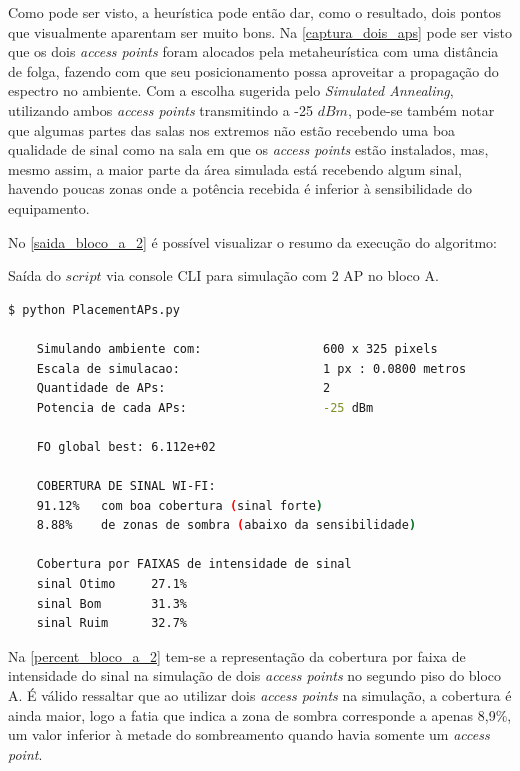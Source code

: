 \documentclass[
	12pt,				%
	twoside,			%
	a4paper,			%
	english,			%
	french,				%
	spanish,			%
	brazil				%
	]{abntex2}
\begin{document}
Como pode ser visto, a heurística pode então dar, como o resultado, dois
pontos que visualmente aparentam ser muito bons. Na
\autoref{captura_dois_aps} pode ser visto que os dois \emph{access
points} foram alocados pela metaheurística com uma distância de folga,
fazendo com que seu posicionamento possa aproveitar a propagação do
espectro no ambiente. Com a escolha sugerida pelo \emph{Simulated
Annealing}, utilizando ambos \emph{access points} transmitindo a -25
\(dBm\), pode-se também notar que algumas partes das salas nos extremos
não estão recebendo uma boa qualidade de sinal como na sala em que os
\emph{access points} estão instalados, mas, mesmo assim, a maior parte
da área simulada está recebendo algum sinal, havendo poucas zonas onde a
potência recebida é inferior à sensibilidade do equipamento.

No \autoref{saida_bloco_a_2} é possível visualizar o resumo da execução
do algoritmo:

\begin{quadro}[!htb]
    \caption{\label{saida_bloco_a_2} Saída do $script$ via console CLI para simulação com 2 AP no bloco A. }

    \begin{lstlisting}[language=bash]
    $ python PlacementAPs.py 

    Simulando ambiente com:                 600 x 325 pixels
    Escala de simulacao:                    1 px : 0.0800 metros
    Quantidade de APs:                      2
    Potencia de cada APs:                   -25 dBm

    FO global best: 6.112e+02

    COBERTURA DE SINAL WI-FI:
    91.12%   com boa cobertura (sinal forte)
    8.88%    de zonas de sombra (abaixo da sensibilidade)

    Cobertura por FAIXAS de intensidade de sinal
    sinal Otimo     27.1%
    sinal Bom       31.3%
    sinal Ruim      32.7%
    \end{lstlisting}

\end{quadro}

Na \autoref{percent_bloco_a_2} tem-se a representação da cobertura por
faixa de intensidade do sinal na simulação de dois \emph{access points}
no segundo piso do bloco A. É válido ressaltar que ao utilizar dois
\emph{access points} na simulação, a cobertura é ainda maior, logo a
fatia que indica a zona de sombra corresponde a apenas 8,9\%, um valor
inferior à metade do sombreamento quando havia somente um \emph{access
point}.
\end{document}

